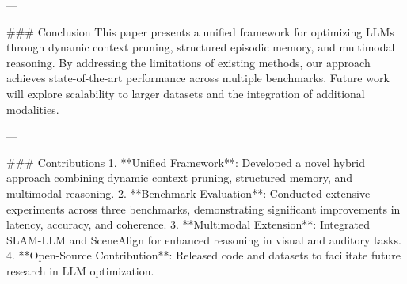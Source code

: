 ---

### Conclusion
This paper presents a unified framework for optimizing LLMs through dynamic context pruning, structured episodic memory, and multimodal reasoning. By addressing the limitations of existing methods, our approach achieves state-of-the-art performance across multiple benchmarks. Future work will explore scalability to larger datasets and the integration of additional modalities.

---

### Contributions
1. **Unified Framework**: Developed a novel hybrid approach combining dynamic context pruning, structured memory, and multimodal reasoning.
2. **Benchmark Evaluation**: Conducted extensive experiments across three benchmarks, demonstrating significant improvements in latency, accuracy, and coherence.
3. **Multimodal Extension**: Integrated SLAM-LLM and SceneAlign for enhanced reasoning in visual and auditory tasks.
4. **Open-Source Contribution**: Released code and datasets to facilitate future research in LLM optimization.